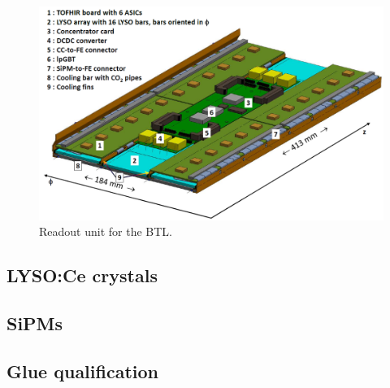\begin{figure}[h]
	\centering
	\includegraphics[width=1.0\linewidth]{Figures/BTL_readoutunit}
	\caption[Readout unit for the BTL.]{Readout unit for the BTL.}
	\label{fig:btlreadoutunit}
\end{figure}


\subsection{LYSO:Ce crystals}


\subsection{SiPMs}


\subsection{Glue qualification}





